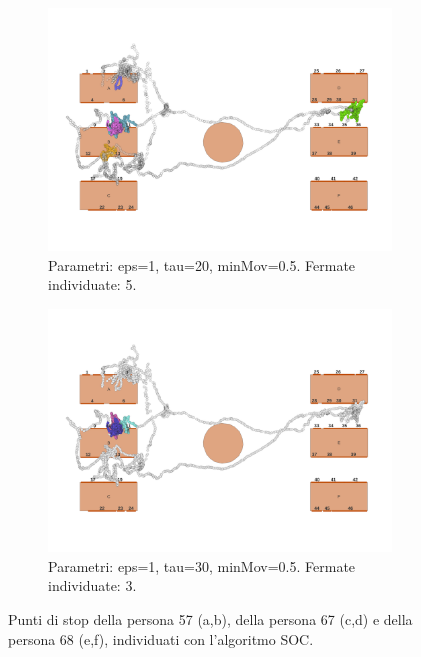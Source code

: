 \documentclass[12pt]{article}
\begin{document}
\begin{figure}[htb!]
\begin{subfigure}[b]{0.45\textwidth}
        \centering
        \includegraphics[width=\textwidth]{images/stop_points_p68_SOC_eps1_tau20_minMov05.png}
        \caption{Parametri: eps=1, tau=20, minMov=0.5. Fermate individuate: 5.}
        \label{stop_points_p68_SOC_eps1_tau20_minMov05}
    \end{subfigure}
    \hfill
    \begin{subfigure}[b]{0.45\textwidth}
        \centering
        \includegraphics[width=\textwidth]{images/stop_points_p68_SOC_eps1_tau30_minMov05.png}
        \caption{Parametri: eps=1, tau=30, minMov=0.5. Fermate individuate: 3.}
        \label{stop_points_p68_SOC_eps1_tau30_minMov05}
    \end{subfigure}
    \hfill
    \caption{Punti di stop della persona 57 (a,b), della persona 67 (c,d) e della persona 68 (e,f), individuati con l'algoritmo SOC.}
    \label{stop_points_SOC}
\end{figure}
\end{document}
